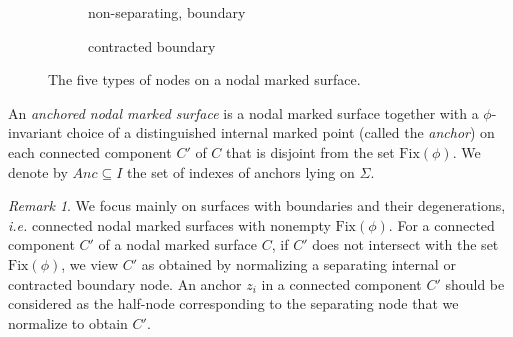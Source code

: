 \documentclass[11pt,a4paper]{article}
\theoremstyle{definition}
\theoremstyle{remark}
\newtheorem{rmk}[dummy]{Remark}
\numberwithin{equation}{section}
\begin{document}
\begin{figure}[h]
\begin{subfigure}{.3\textwidth}
\vspace{0.15cm}

  \caption{non-separating, boundary}
\end{subfigure}
\begin{subfigure}{.3\textwidth}
  \centering

\vspace{0.15cm}

  \caption{contracted boundary }
\end{subfigure}





\caption{The five types of nodes on a nodal marked surface.}
\label{fig node type}
\end{figure}



An \textit{anchored nodal marked surface} is a nodal marked surface together with a $\phi$-invariant choice of a distinguished internal marked point (called the \textit{anchor}) on each connected component $C'$ of $C$ that is disjoint from the set $\text{Fix}(\phi)$. We denote by $Anc\subseteq I$ the set of indexes of anchors lying on $\Sigma$. 
\begin{rmk}
We focus mainly on surfaces with boundaries and their degenerations, \textit{i.e.} connected nodal marked surfaces with nonempty $\text{Fix}(\phi)$. For a connected component $C'$ of a nodal marked surface $C$, if $C'$ does not intersect with the set $\text{Fix}(\phi)$, we view $C'$ as obtained by normalizing a separating internal or contracted boundary node. 
An anchor $z_i$ in a connected component $C'$ should be considered as the half-node corresponding to the separating node that we normalize to obtain $C'$.
\end{rmk}
\end{document}
